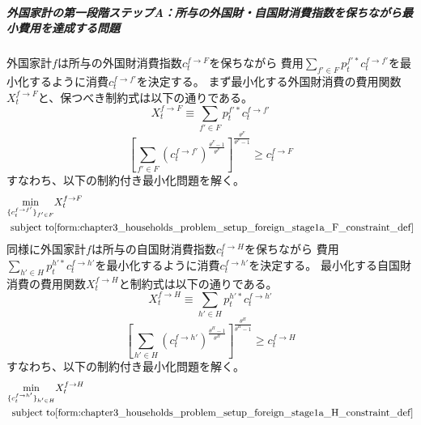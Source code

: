 \subparagraph{外国家計の第一段階ステップA：所与の外国財・自国財消費指数を保ちながら最小費用を達成する問題}
\label{sec:chapter3_households_problem_setup_foreign_stage1a}
外国家計\(f\)は所与の外国財消費指数\(c_t^{f\to F}\)を保ちながら
費用\(\sum_{f'\in F}p_t^{f'*}c_t^{f\to f'}\)を最小化するように消費\(c_t^{f\to f'}\)を決定する。
まず最小化する外国財消費の費用関数\(X_t^{f\to F}\)と、保つべき制約式は以下の通りである。
\begin{equation}
\label{form:chapter3_households_problem_setup_foreign_stage1a_F_X_def}
    X_t^{f\to F}\equiv\sum_{f'\in F}p_t^{f'*}c_t^{f\to f'}
\end{equation}
\begin{equation}
\label{form:chapter3_households_problem_setup_foreign_stage1a_F_constraint_def}
    \left[\sum_{f'\in F}(c_t^{f\to f'})^{\frac{\theta^F-1}{\theta^F}}\right]^{\frac{\theta^F}{\theta^F-1}}\ge c_t^{f\to F}
\end{equation}
すなわち、以下の制約付き最小化問題を解く。
\begin{equation}
\label{form:chapter3_households_problem_setup_foreign_stage1a_F_min_def}
    \begin{aligned}
        \min_{\{c_t^{f\to f'}\}_{f'\in F}}
        &X_t^{f\to F}\\
        \text{subject to}
        &\eqref{form:chapter3_households_problem_setup_foreign_stage1a_F_constraint_def}
    \end{aligned}
\end{equation}
同様に外国家計\(f\)は所与の自国財消費指数\(c_t^{f\to H}\)を保ちながら
費用\(\sum_{h'\in H}p_t^{h'*}c_t^{f\to h'}\)を最小化するように消費\(c_t^{f\to h'}\)を決定する。
最小化する自国財消費の費用関数\(X_t^{f\to H}\)と制約式は以下の通りである。
\begin{equation}
\label{form:chapter3_households_problem_setup_foreign_stage1a_H_X_def}
    X_t^{f\to H}\equiv\sum_{h'\in H}p_t^{h'*}c_t^{f\to h'}
\end{equation}
\begin{equation}
\label{form:chapter3_households_problem_setup_foreign_stage1a_H_constraint_def}
    \left[\sum_{h'\in H}(c_t^{f\to h'})^{\frac{\theta^H-1}{\theta^H}}\right]^{\frac{\theta^H}{\theta^H-1}}\ge c_t^{f\to H}
\end{equation}
すなわち、以下の制約付き最小化問題を解く。
\begin{equation}
\label{form:chapter3_households_problem_setup_foreign_stage1a_H_min_def}
    \begin{aligned}
        \min_{\{c_t^{f\to h'}\}_{h'\in H}}
        &X_t^{f\to H}\\
        \text{subject to}
        &\eqref{form:chapter3_households_problem_setup_foreign_stage1a_H_constraint_def}
    \end{aligned}
\end{equation}

